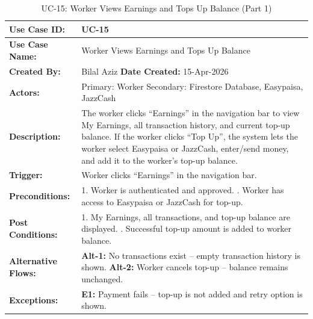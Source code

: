 {\small
\renewcommand{\arraystretch}{1.05}
\begin{table}[H]
\centering
\begin{tabular}{|p{3cm}|p{11.2cm}|}
\hline
\textbf{Use Case ID:} & UC-15 \\ \hline
\textbf{Use Case Name:} & Worker Views Earnings and Tops Up Balance \\ \hline
\textbf{Created By:} & Bilal Aziz \hfill \textbf{Date Created:} 15-Apr-2026 \\ \hline
\textbf{Actors:} & Primary: Worker \quad Secondary: Firestore Database, Easypaisa, JazzCash \\ \hline
\textbf{Description:} & The worker clicks ``Earnings'' in the navigation bar to view My Earnings, all transaction history, and current top-up balance. If the worker clicks ``Top Up'', the system lets the worker select Easypaisa or JazzCash, enter/send money, and add it to the worker's top-up balance. \\ \hline
\textbf{Trigger:} & Worker clicks ``Earnings'' in the navigation bar. \\ \hline
\textbf{Preconditions:} & 1. Worker is authenticated and approved. \newline 2. Worker has access to Easypaisa or JazzCash for top-up. \\ \hline
\textbf{Post Conditions:} & 1. My Earnings, all transactions, and top-up balance are displayed. \newline 2. Successful top-up amount is added to worker balance. \\ \hline
\textbf{Alternative Flows:} & \textbf{Alt-1:} No transactions exist -- empty transaction history is shown. \newline \textbf{Alt-2:} Worker cancels top-up -- balance remains unchanged. \\ \hline
\textbf{Exceptions:} & \textbf{E1:} Payment fails -- top-up is not added and retry option is shown. \\ \hline
\end{tabular}
\caption*{UC-15: Worker Views Earnings and Tops Up Balance (Part 1)}
\end{table}
}

\newpage

